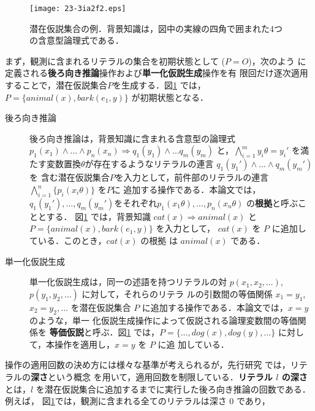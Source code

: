 \documentclass[japanese]{jnlp_1.4}
\begin{document}
\begin{figure}[t]
\begin{center}
\texttt{[image: 23-3ia2f2.eps]}
\end{center}
\caption{潜在仮説集合の例．背景知識は，図中の実線の四角で囲まれた4つの含意型論理式である．}
\label{fig:lhs}
\end{figure}

まず，観測に含まれるリテラルの集合を初期状態として ($P=O$)，次のよう
に定義される\textbf{後ろ向き推論}操作および\textbf{単一化仮説生成}操作を有
限回だけ逐次適用することで，潜在仮説集合$P$を生成する．図\ref{fig:lhs}
では，$P=\{\mathit{animal}(x),\mathit{bark}(e_1,y)\}$ が初期状態となる．
\begin{description}
\item[後ろ向き推論] 後ろ向き推論は，背景知識に含まれる含意型の論理式
	      $p_1(x_1) \land \ldots \land p_n(x_n)
	      \Rightarrow q_1(y_1) \land \ldots q_m(y_m)$
	      と，$\bigwedge_{i=1}^m y_i\theta = y_i'$
	      を満たす変数置換$\theta$が存在するようなリテラルの連言
	      $q_1(y_1') \land \ldots \land q_m(y_m')$ を
	      含む潜在仮説集合$P$を入力として，前件部のリテラルの連言
	      $\bigwedge_{i=1}^{n} \{p_i(x_i\theta)\}$ を$P$に
	      追加する操作である．本論文では，$q_1(y_1'), \ldots,
	      q_m(y_m')$をそれぞれ$p_1(x_1\theta),
	      \ldots, p_n(x_n\theta)$ の{\bf 根拠}と呼ぶこととする．
	      図\ref{fig:lhs} では，背景知識 $\mathit{cat}(x) \Rightarrow
	      \mathit{animal}(x)$ と$P=\{\mathit{animal}(x),\mathit{bark}(e_1,y)\}$ を入力として，
	      $\mathit{cat}(x)$ を $P$ に追加している．このとき，$\mathit{cat}(x)$ の根拠
	      は $\mathit{animal}(x)$ である．
\item[単一化仮説生成] 単一化仮説生成は，同一の述語を持つリテラルの対
	      $p(x_1,x_2,\ldots)$, $p(y_1,y_2,\ldots)$ に対して，それらのリテラ
	      ルの引数間の等価関係 $x_1=y_1$, $x_2=y_2,\ldots$ を潜在仮説集合
	      $P$ に追加する操作である．本論文では，$x=y$のような，単一
	      化仮説生成操作によって仮説される論理変数間の等価関係を{\bf
	      等価仮説}と呼ぶ．図\ref{fig:lhs} では，$P=\{\ldots, \mathit{dog}(x),
	      \mathit{dog}(y), \ldots\}$ に対して，本操作を適用し，$x=y$ を $P$ に追
	      加している．
\end{description}
操作の適用回数の決め方には様々な基準が考えられるが，先行研究
\cite{Inoue11,Inoue12,Yamamoto15}では，リテラルの\textbf{深さ}という概念
を用いて，適用回数を制限している．\textbf{リテラル $l$ の深さ}とは，$l$
を潜在仮説集合に追加するまでに実行した後ろ向き推論の回数である．例えば，
図\ref{fig:lhs}では，観測に含まれる全てのリテラルは深さ 0 であり，
\end{document}
